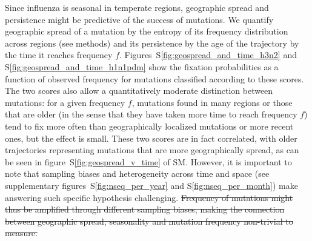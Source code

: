 \documentclass[reprint,amsmath,amssymb,superscriptaddress,showpacs,rmp]{revtex4-1}
\newcommand{\sref}[1]{S\ref{#1}}
\providecommand{\DIFdel}[1]{{\protect\color{red}\sout{#1}}}                      %
\providecommand{\DIFdelbegin}{} %
\providecommand{\DIFdelend}{} %
\newcommand{\DIFscaledelfig}{0.5}
\newlength{\DIFdelgraphicswidth} %
\newlength{\DIFdelgraphicsheight} %
\newcommand{\DIFdelincludegraphics}[2][]{%
\sbox{\DIFdelgraphicsbox}{\DIFOincludegraphics[#1]{#2}}%
\settoboxwidth{\DIFdelgraphicswidth}{\DIFdelgraphicsbox} %
\settoboxtotalheight{\DIFdelgraphicsheight}{\DIFdelgraphicsbox} %
\scalebox{\DIFscaledelfig}{%
\parbox[b]{\DIFdelgraphicswidth}{\usebox{\DIFdelgraphicsbox}\\[-\baselineskip] \rule{\DIFdelgraphicswidth}{0em}}\llap{\resizebox{\DIFdelgraphicswidth}{\DIFdelgraphicsheight}{%
\setlength{\unitlength}{\DIFdelgraphicswidth}%
\begin{picture}(1,1)%
\thicklines\linethickness{2pt} %
{\color[rgb]{1,0,0}\put(0,0){\framebox(1,1){}}}%
{\color[rgb]{1,0,0}\put(0,0){\line( 1,1){1}}}%
{\color[rgb]{1,0,0}\put(0,1){\line(1,-1){1}}}%
\end{picture}%
}\hspace*{3pt}}} %
} %
\DeclareRobustCommand{\DIFdelbegin}{\DIFOdelbegin \let\includegraphics\DIFdelincludegraphics} %
\DeclareRobustCommand{\DIFdelend}{\DIFOaddend \let\includegraphics\DIFOincludegraphics} %
\begin{document}
Since influenza is seasonal in temperate regions, geographic spread and persistence might be predictive of the success of mutations.
We quantify geographic spread of a mutation by the entropy of its frequency distribution across regions (see methods) and its persistence by the age of the trajectory by the time it reaches frequency $f$.
Figures~\sref{fig:geospread_and_time_h3n2} and \sref{fig:geospread_and_time_h1n1pdm} show the fixation probabilities as a function of observed frequency for mutations classified according to these scores.
The two scores also allow a quantitatively moderate distinction between mutations: for a given frequency $f$, mutations found in many regions or those that are older (in the sense that they have taken more time to reach frequency $f$) tend to fix more often than geographically localized mutations or more recent ones, but the effect is small.
These two scores are in fact correlated, with older trajectories representing mutations that are more geographically spread, as can be seen in figure~\sref{fig:geospread_v_time} of SM.
However, it is important to note that sampling biases and heterogeneity across time and space (see supplementary figures~\sref{fig:nseq_per_year} and \sref{fig:nseq_per_month}) make answering such specific hypothesis challenging.
\DIFdelbegin \DIFdel{Frequency of mutations might thus be amplified through different sampling biases, making the connection between geographic spread, seasonality and mutation frequency non-trivial to measure. 
}\DIFdelend %
\end{document}
